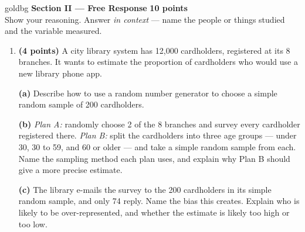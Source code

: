 \documentclass[12pt]{article}
\begin{document}
\vspace{0.14in}

\boxguard[30]
\begin{headlinebox}{goldbg}
\small
\textbf{Section II --- Free Response} \hfill \textbf{10 points}\\
Show your reasoning. Answer \emph{in context} --- name the people or things studied and the
variable measured.
\end{headlinebox}

\vspace{0.10in}

\begin{enumerate}[leftmargin=1.9em, itemsep=0.16in, resume]

  \boxguard[26]
  \item \textbf{(4 points)} A city library system has 12{,}000 cardholders, registered at its 8
        branches. It wants to estimate the proportion of cardholders who would use a new
        library phone app.

        \vspace{6pt}
        \textbf{(a)} Describe how to use a random number generator to choose a simple random
        sample of 200 cardholders.\\[4pt]

        \boxguard[16]
        \vspace{6pt}
        \textbf{(b)} \emph{Plan A:} randomly choose 2 of the 8 branches and survey every
        cardholder registered there. \emph{Plan B:} split the cardholders into three age
        groups --- under 30, 30 to 59, and 60 or older --- and take a simple random sample from
        each. Name the sampling method each plan uses, and explain why Plan B should give a
        more precise estimate.\\[4pt]

        \boxguard[16]
        \vspace{6pt}
        \textbf{(c)} The library e-mails the survey to the 200 cardholders in its simple random
        sample, and only 74 reply. Name the bias this creates. Explain who is likely to be
        over-represented, and whether the estimate is likely too high or too low.\\[4pt]


\end{enumerate}
\end{document}
